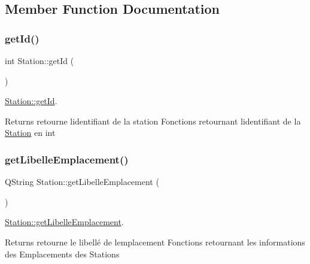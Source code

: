 \subsection{Member Function Documentation}
\mbox{\label{class_station_a55b1b6e24c949165ca96d038125b72a6}} 
\subsubsection{\texorpdfstring{get\+Id()}{getId()}}
{\footnotesize\ttfamily int Station\+::get\+Id (\begin{DoxyParamCaption}{ }\end{DoxyParamCaption})}



\hyperlink{class_station_a55b1b6e24c949165ca96d038125b72a6}{Station\+::get\+Id}. 

\begin{DoxyReturn}{Returns}
retourne l\textquotesingle{}identifiant de la station Fonctions retournant l\textquotesingle{}identifiant de la \hyperlink{class_station}{Station} en int 
\end{DoxyReturn}
\mbox{\label{class_station_a6d4fa8bd0c2afa28aae831cd04938394}} 
\subsubsection{\texorpdfstring{get\+Libelle\+Emplacement()}{getLibelleEmplacement()}}
{\footnotesize\ttfamily Q\+String Station\+::get\+Libelle\+Emplacement (\begin{DoxyParamCaption}{ }\end{DoxyParamCaption})}



\hyperlink{class_station_a6d4fa8bd0c2afa28aae831cd04938394}{Station\+::get\+Libelle\+Emplacement}. 

\begin{DoxyReturn}{Returns}
retourne le libellé de l\textquotesingle{}emplacement Fonctions retournant les informations des Emplacements des Stations 
\end{DoxyReturn}
\mbox{\label{class_station_a0f0c47ed8e52e6d506c50512b915049a}} 
